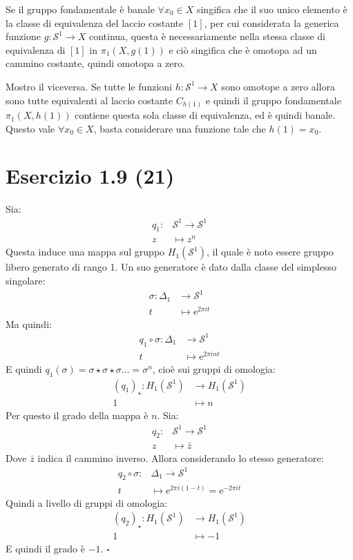 \documentclass[10pt]{scrartcl}
\newcommand{\Sph}[1][]{\mathcal{S}^#1}
\begin{document}
Se il gruppo fondamentale è banale $ \forall x_0 \in X $ singifica che il suo unico elemento
è la classe di equivalenza del laccio costante $ [1] $, per cui considerata
la generica funzione $ g \colon \Sph{1} \to X $ continua, questa è necessariamente
nella stessa classe di equivalenza di $ [1] $ in $ \pi_1(X, g(1)) $ e ciò singifica
che è omotopa ad un cammino costante, quindi omotopa a zero.

Mostro il viceversa. Se tutte le funzioni $ h \colon \Sph{1} \to X $ sono omotope a zero
allora sono tutte equivalenti al laccio costante $ C_{h(1)} $ e quindi il gruppo
fondamentale $ \pi_1(X, h(1)) $ contiene questa sola classe di equivalenza, ed è
quindi banale. Questo vale $ \forall x_0 \in X $, basta considerare una funzione tale
che $ h(1) = x_0 $.

\section*{Esercizio 1.9 (21)}
Sia:
\begin{align*}
  q_1 \colon & \Sph{1} \to \Sph{1} \\
  z & \mapsto z^n
\end{align*}
Questa induce una mappa sul gruppo $ H_1(\Sph{1}) $,
il quale è noto essere gruppo libero generato di rango 1.
Un suo generatore è dato dalla classe del simplesso
singolare:
\begin{align*}
  \sigma \colon \Delta_1 & \to \Sph{1} \\
  t & \mapsto \mathrm{e}^{2 \pi i t}
\end{align*}
Ma quindi:
\begin{align*}
  q_1 \circ \sigma \colon \Delta_1 & \to \Sph{1} \\
  t & \mapsto \mathrm{e}^{2 \pi i n t}
\end{align*}
E quindi $ q_1(\sigma) = \sigma \star \sigma \star \sigma \dots = \sigma^n $, cioè sui gruppi
di omologia:
\begin{align*}
  (q_1)_\star \colon H_1(\Sph{1}) & \to H_1(\Sph{1}) \\
  1 & \mapsto n
\end{align*}
Per questo il grado della mappa è $ n $.
Sia:
\begin{align*}
  q_2 \colon & \Sph{1} \to \Sph{1} \\
  z & \mapsto \bar{z}
\end{align*}
Dove $ \bar{z} $ indica il cammino inverso. Allora
considerando lo stesso generatore:
\begin{align*}
  q_2 \circ \sigma \colon & \Delta_1 \to \Sph{1} \\
  t & \mapsto \mathrm{e}^{2 \pi i (1 - t)} = \mathrm{e}^{-2 \pi i t}
\end{align*}
Quindi a livello di gruppi di omologia:
\begin{align*}
  (q_2)_\star \colon H_1(\Sph{1}) & \to H_1(\Sph{1}) \\
  1 & \mapsto -1
\end{align*}
E quindi il grado è $ -1 $.
\hfill $ \square $
\end{document}
